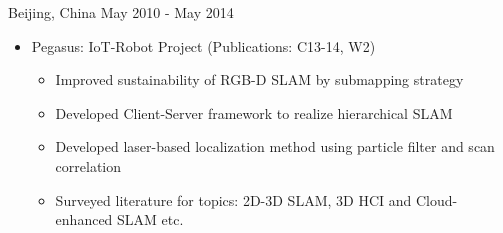 \begin{cventries}
		{Beijing, China} %
		{May 2010 - May 2014} %
		{
			\vspace{-4.0mm}
			\begin{justify}
				\begin{itemize}[leftmargin=2ex, nosep, noitemsep]
					\setlength{\parskip}{0pt}
					\renewcommand{\labelitemi}{\bullet}
					\item {Pegasus: IoT-Robot Project (Publications: C13-14, W2)}
					\begin{itemize}[leftmargin=3ex]
						\scriptsize
						\item {Improved sustainability of RGB-D SLAM by submapping strategy}
						\item {Developed Client-Server framework to realize hierarchical SLAM}
						\item {Developed laser-based localization method using particle filter and scan correlation}
						\item {Surveyed literature for topics: 2D-3D SLAM, 3D HCI and Cloud-enhanced SLAM etc.}
					\end{itemize}
				\end{itemize}
			\end{justify}
			\vspace{-4.0mm}  
		}

\end{cventries}
